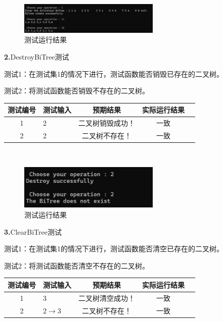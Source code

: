 \documentclass[supercite]{Experimental_Report}
\theoremstyle{definition}
\begin{document}
~\

 \begin{figure}[H]
 	\centering
 	\includegraphics[width=0.6\textwidth]{images/二叉树测试1.png}
 	\caption{测试运行结果}
 	\label{txlab}
 \end{figure}

\noindent\textbf{ 2.}DestroyBiTree测试

测试1：在测试集1的情况下进行，测试函数能否销毁已存在的二叉树。

测试2：将测试函数能否销毁不存在的二叉树。

\vspace{0.5em}

\begin{tabular}{|c|l|c|c|c|}
	\hline
	测试编号 & 测试输入 & 预期结果 & 实际运行结果 \\
	\hline
	1 & 2 & 二叉树销毁成功！ & 一致 \\
	\hline
	2 & 2 & 二叉树不存在！& 一致 \\
	\hline
\end{tabular}

~\

\begin{figure}[H]
 	\centering
 	\includegraphics[width=0.6\textwidth]{images/二叉树测试2.png}
 	\caption{测试运行结果}
 	\label{txlab}
 \end{figure}

\noindent\textbf{ 3.}ClearBiTree测试

测试1：在测试集1的情况下进行，测试函数能否清空已存在的二叉树。

测试2：将测试函数能否清空不存在的二叉树。

\vspace{0.5em}

\begin{tabular}{|c|l|c|c|c|}
	\hline
	测试编号 & 测试输入 & 预期结果 & 实际运行结果 \\
	\hline
	1 & 3 & 二叉树清空成功！ & 一致 \\
	\hline
	2 & 2$\rightarrow$3 & 二叉树不存在！ & 一致 \\
	\hline
\end{tabular}
\end{document}
